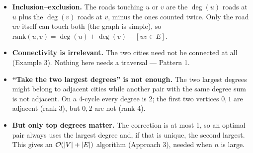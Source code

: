 \begin{itemize}[leftmargin=*]
    \item \textbf{Inclusion--exclusion.} The roads touching $u$ or $v$ are the $\deg(u)$ roads at $u$ plus the $\deg(v)$ roads at $v$, minus the ones counted twice. Only the road $uv$ itself can touch both (the graph is simple), so $\text{rank}(u,v) = \deg(u) + \deg(v) - [uv \in E]$.
    \item \textbf{Connectivity is irrelevant.} The two cities need not be connected at all (Example 3). Nothing here needs a traversal --- Pattern 1.
    \item \textbf{``Take the two largest degrees'' is not enough.} The two largest degrees might belong to adjacent cities while another pair with the same degree sum is not adjacent. On a 4-cycle every degree is 2; the first two vertices $0,1$ are adjacent (rank 3), but $0,2$ are not (rank 4).
    \item \textbf{But only top degrees matter.} The correction is at most 1, so an optimal pair always uses the largest degree and, if that is unique, the second largest. This gives an $\mathcal{O}(|V|+|E|)$ algorithm (Approach 3), needed when $n$ is large.
\end{itemize}

\begin{diagrambox}
\end{diagrambox}

